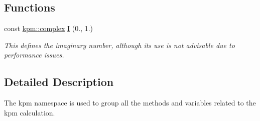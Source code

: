 \subsection*{Functions}
\begin{DoxyCompactItemize}
\item 
const \hyperlink{namespacekpm_a875b8f1ec538e5baeb0d6e8628b6aaac}{kpm\+::complex} \hyperlink{namespacekpm_a8bac0feeb2db514bab23054034b6cad4}{I} (0., 1.)\hypertarget{namespacekpm_a8bac0feeb2db514bab23054034b6cad4}{}\label{namespacekpm_a8bac0feeb2db514bab23054034b6cad4}

\begin{DoxyCompactList}\small\item\em This defines the imaginary number, although its use is not advisable due to performance issues. \end{DoxyCompactList}\end{DoxyCompactItemize}


\subsection{Detailed Description}
The kpm namespace is used to group all the methods and variables related to the kpm calculation. 